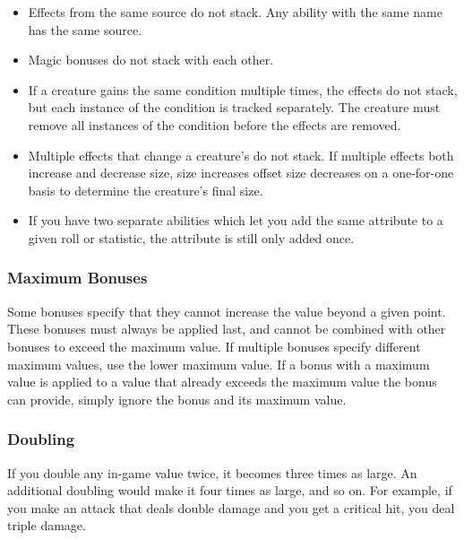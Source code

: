 
            \begin{itemize}
                \item Effects from the same source do not stack. Any ability with the same name has the same source.
                \item Magic bonuses do not stack with each other.
                \item If a creature gains the same condition multiple times, the effects do not stack, but each instance of the condition is tracked separately.
                    The creature must remove all instances of the condition before the effects are removed.
                \item Multiple effects that change a creature's  do not stack.
                    If multiple effects both increase and decrease size, size increases offset size decreases on a one-for-one basis to determine the creature's final size.
                \item If you have two separate abilities which let you add the same attribute to a given roll or statistic, the attribute is still only added once.
            \end{itemize}

        \subsubsection{Maximum Bonuses}\label{Ability Limits}
            Some bonuses specify that they cannot increase the value beyond a given point.
            These bonuses must always be applied last, and cannot be combined with other bonuses to exceed the maximum value.
            If multiple bonuses specify different maximum values, use the lower maximum value.
            If a bonus with a maximum value is applied to a value that already exceeds the maximum value the bonus can provide, simply ignore the bonus and its maximum value.

        \subsubsection{Doubling}\label{Doubling}
            If you double any in-game value twice, it becomes three times as large. An additional doubling would make it four times as large, and so on. For example, if you make an attack that deals double damage and you get a critical hit, you deal triple damage.

